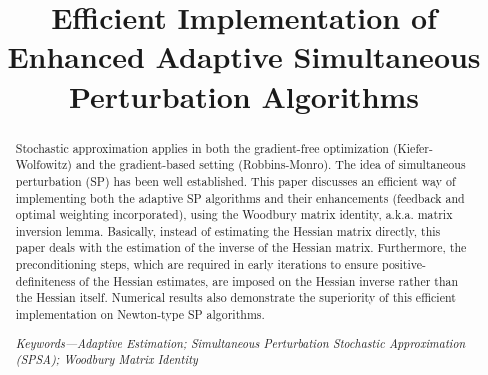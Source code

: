 \documentclass[conference]{IEEEtran}
\begin{document}
\title{Efficient Implementation of Enhanced Adaptive
  Simultaneous Perturbation Algorithms}
\author{
   \and
    \and {} }

\maketitle

\begin{abstract} Stochastic approximation applies in both the
  gradient-free optimization (Kiefer-Wolfowitz) and the gradient-based
  setting (Robbins-Monro). The idea of simultaneous perturbation (SP)
  has been well established. This paper discusses an efficient way of
  implementing both the adaptive SP algorithms and their enhancements
  (feedback and optimal weighting incorporated), using the Woodbury
  matrix identity, a.k.a. matrix inversion lemma. Basically, instead of
  estimating the Hessian matrix directly, this paper deals with the
  estimation of the inverse of the Hessian matrix. Furthermore, the
  preconditioning steps, which are required in early iterations to
  ensure positive-definiteness of the Hessian estimates, are imposed on
  the Hessian inverse rather than the Hessian itself. Numerical results
  also demonstrate the superiority of this efficient implementation on
  Newton-type SP algorithms.

  \textit{Keywords---Adaptive Estimation; Simultaneous
    Perturbation Stochastic Approximation (SPSA); Woodbury Matrix
    Identity}
\end{abstract}

\IEEEpeerreviewmaketitle
\end{document}
